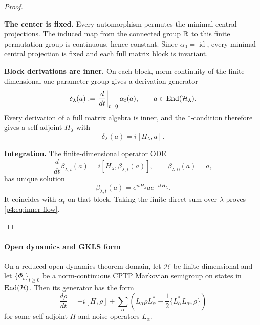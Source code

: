 \documentclass[12pt,a4paper]{article}
\begin{document}
\begin{proof}
\begin{proofsteps}

\item \textbf{The center is fixed.}
Every automorphism permutes the minimal central projections.  The induced map
from the connected group \(\mathbb{R}\) to this finite permutation group is
continuous, hence constant.  Since \(\alpha_0=\operatorname{id}\), every
minimal central projection is fixed and each full matrix block is invariant.

\item \textbf{Block derivations are inner.}
On each block, norm continuity of the finite-dimensional one-parameter group
gives a derivation generator
\[
\delta_\lambda(a):=
\left.\frac{d}{dt}\right|_{t=0}\alpha_t(a),
\qquad a\in\operatorname{End}(\mathcal H_\lambda).
\]
Every derivation of a full matrix algebra is inner, and the \(*\)-condition
therefore gives a self-adjoint \(H_\lambda\) with
\[
\delta_\lambda(a)=i[H_\lambda,a].
\]

\item \textbf{Integration.}
The finite-dimensional operator ODE
\[
\frac{d}{dt}\beta_{\lambda,t}(a)
=i[H_\lambda,\beta_{\lambda,t}(a)],
\qquad
\beta_{\lambda,0}(a)=a,
\]
has unique solution
\[
\beta_{\lambda,t}(a)=e^{itH_\lambda}ae^{-itH_\lambda}.
\]
It coincides with \(\alpha_t\) on that block.  Taking the finite direct sum
over \(\lambda\) proves \eqref{p4:eq:inner-flow}.
\end{proofsteps}

\end{proof}



\paragraph{Open dynamics and GKLS form}
\label{p4:sec:part1-gkls}

\begin{theorem}
\label{p4:thm:gkls}
On a reduced-open-dynamics theorem domain, let \(\mathcal H\) be finite dimensional and let \(\{\Phi_t\}_{t\ge0}\) be a norm-continuous CPTP Markovian semigroup on states in \(\operatorname{End}(\mathcal H)\).  Then its generator has the form
\begin{equation}
\label{p4:eq:gkls}
\frac{d\rho}{dt}
=
-i[H,\rho]
+
\sum_\alpha\left(L_\alpha\rho L_\alpha^*-
\frac12\{L_\alpha^*L_\alpha,\rho\}\right)
\end{equation}
for some self-adjoint \(H\) and noise operators \(L_\alpha\).
\end{theorem}
\end{document}
